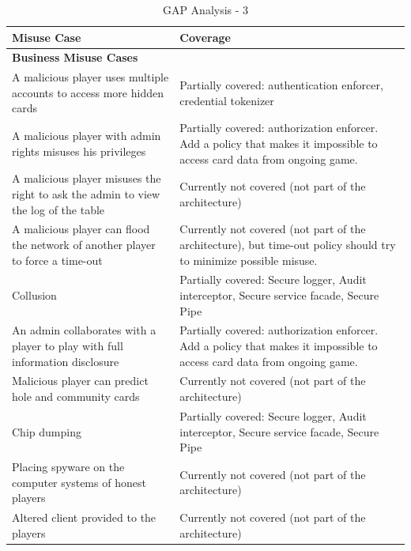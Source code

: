 \documentclass[a4paper,11pt]{report}
\begin{document}
\begin{table}[htpb]
\begin{center}
\begin{tabular}{| p{5cm} | p{} |}
\hline
\textbf{Misuse Case} 	& \textbf{Coverage} \\
\hline
\hline
\textbf{Business Misuse Cases} & \\\hline
A malicious player uses multiple accounts to access more hidden cards & Partially covered: authentication enforcer, credential tokenizer \\\hline
A malicious player with admin rights misuses his privileges & Partially covered: authorization enforcer. Add a policy that makes it impossible to access card data from ongoing game. \\\hline
A malicious player misuses the right to ask the admin to view the log of the table & Currently not covered (not part of the architecture) \\\hline
A malicious player can ﬂood the network of another player to force a time-out & Currently not covered (not part of the architecture), but time-out policy should try to minimize possible misuse. \\\hline
Collusion & Partially covered: Secure logger, Audit interceptor, Secure service facade, Secure Pipe \\\hline
An admin collaborates with a player to play with full information disclosure & Partially covered: authorization enforcer. Add a policy that makes it impossible to access card data from ongoing game. \\\hline
Malicious player can predict hole and community cards & Currently not covered (not part of the architecture) \\\hline
Chip dumping & Partially covered: Secure logger, Audit interceptor, Secure service facade, Secure Pipe \\\hline
Placing spyware on the computer systems of honest players & Currently not covered (not part of the architecture) \\\hline
Altered client provided to the players & Currently not covered (not part of the architecture) \\\hline
\end{tabular}
\end{center}
\caption{GAP Analysis - 3}
\label{table:gap3}
\end{table}
\end{document}
